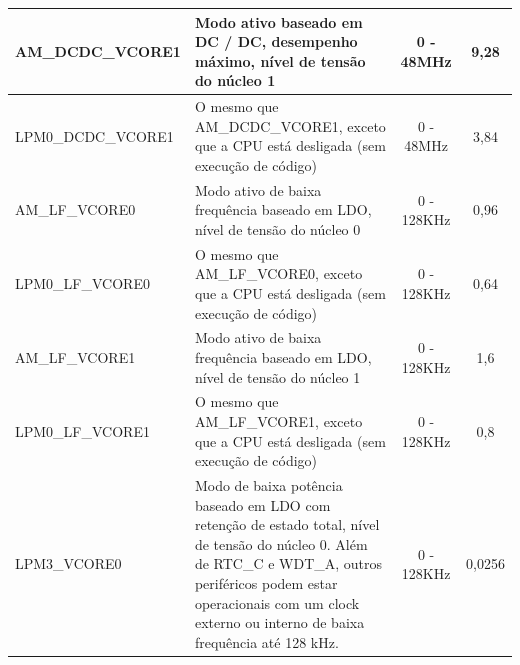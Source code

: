 \begin{apendicesenv}
\begin{table}[h]
{\begin{tabular}{@{}llcc@{}}
AM\_DCDC\_VCORE1                      & \multicolumn{1}{p{10.5cm}}{\raggedright Modo ativo baseado em DC / DC, desempenho máximo, nível de tensão do núcleo 1                                                                                                                                                          }& 0 - 48MHz     & 9,28             \\ \hline
LPM0\_DCDC\_VCORE1                    & \multicolumn{1}{p{10.5cm}}{\raggedright O mesmo que AM\_DCDC\_VCORE1, exceto que a CPU está desligada (sem execução de código)                                                                                                                                                 }& 0 - 48MHz     & 3,84             \\ \hline
AM\_LF\_VCORE0                        & \multicolumn{1}{p{10.5cm}}{\raggedright Modo ativo de baixa frequência baseado em LDO, nível de tensão do núcleo 0                                                                                                                                                             }& 0 - 128KHz    & 0,96             \\ \hline
LPM0\_LF\_VCORE0                      & \multicolumn{1}{p{10.5cm}}{\raggedright O mesmo que AM\_LF\_VCORE0, exceto que a CPU está desligada (sem execução de código)                                                                                                                                                   }& 0 - 128KHz    & 0,64             \\ \hline
AM\_LF\_VCORE1                        & \multicolumn{1}{p{10.5cm}}{\raggedright Modo ativo de baixa frequência baseado em LDO, nível de tensão do núcleo 1                                                                                                                                                             }& 0 - 128KHz    & 1,6              \\ \hline
LPM0\_LF\_VCORE1                      & \multicolumn{1}{p{10.5cm}}{\raggedright O mesmo que AM\_LF\_VCORE1, exceto que a CPU está desligada (sem execução de código)                                                                                                                                                   }& 0 - 128KHz    & 0,8              \\ \hline
LPM3\_VCORE0                          & \multicolumn{1}{p{10.5cm}}{\raggedright Modo de baixa potência baseado em LDO com retenção de estado total, nível de tensão do núcleo 0. Além de RTC\_C e WDT\_A, outros periféricos podem estar operacionais com um clock externo ou interno de baixa frequência até 128 kHz. }& 0 - 128KHz    & 0,0256           \\ \hline

\end{tabular}}
\end{table}
\end{apendicesenv}
